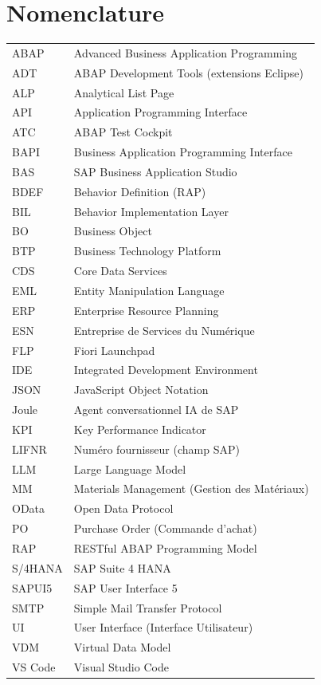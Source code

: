 \documentclass[12pt,a4paper,oneside]{report}
\begin{document}
\chapter*{Nomenclature}
{}
\label{sec:nomenclature}
{\normalsize
\renewcommand{\arraystretch}{1.1}
\begin{tabular}{p{}p{}}
ABAP        & Advanced Business Application Programming \\
ADT         & ABAP Development Tools (extensions Eclipse) \\
ALP         & Analytical List Page \\
API         & Application Programming Interface \\
ATC         & ABAP Test Cockpit \\
BAPI        & Business Application Programming Interface \\
BAS         & SAP Business Application Studio \\
BDEF        & Behavior Definition (RAP) \\
BIL         & Behavior Implementation Layer \\
BO          & Business Object \\
BTP         & Business Technology Platform \\
CDS         & Core Data Services \\
EML         & Entity Manipulation Language \\
ERP         & Enterprise Resource Planning \\
ESN         & Entreprise de Services du Numérique \\
FLP         & Fiori Launchpad \\
IDE         & Integrated Development Environment \\
JSON        & JavaScript Object Notation \\
Joule       & Agent conversationnel IA de SAP \\
KPI         & Key Performance Indicator \\
LIFNR       & Numéro fournisseur (champ SAP) \\
LLM         & Large Language Model \\
MM          & Materials Management (Gestion des Matériaux) \\
OData       & Open Data Protocol \\
PO          & Purchase Order (Commande d'achat) \\
RAP         & RESTful ABAP Programming Model \\
S/4HANA     & SAP Suite 4 HANA \\
SAPUI5      & SAP User Interface 5 \\
SMTP        & Simple Mail Transfer Protocol \\
UI          & User Interface (Interface Utilisateur) \\
VDM         & Virtual Data Model \\
VS Code     & Visual Studio Code \\
\end{tabular}
}
\end{document}
